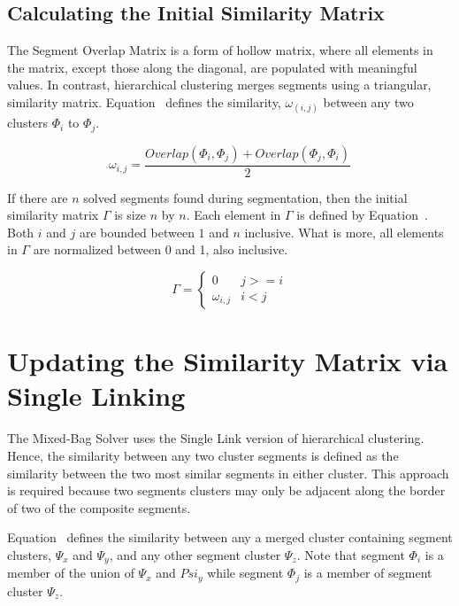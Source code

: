 \subsection{Calculating the Initial Similarity Matrix}

The Segment Overlap Matrix is a form of hollow matrix, where all elements in the matrix, except those along the diagonal, are populated with meaningful values.  In contrast, hierarchical clustering merges segments using a triangular, similarity matrix.  Equation~ defines the similarity, $\omega_(i,j)$ between any two clusters $\Phi_i$ to $\Phi_j$.

\begin{equation} \label{eq:segmentSimilarity}
\omega_{i,j} = \frac{Overlap(\Phi_i, \Phi_j) + Overlap(\Phi_j, \Phi_i)}{2} 
\end{equation}

If there are $n$ solved segments found during segmentation, then the initial similarity matrix $\Gamma$ is size $n$ by $n$.  Each element in $\Gamma$ is defined by Equation~.  Both $i$ and $j$ are bounded between $1$ and $n$ inclusive.  What is more, all elements in $\Gamma$ are normalized between 0 and 1, also inclusive.

\begin{equation} \label{eq:similarityMatrix}
\Gamma = \begin{cases} 
	0 & j >= i
\\
	\omega_{i,j} & i < j
\end{cases} 
\end{equation}

\section{Updating the Similarity Matrix via Single Linking}

The Mixed-Bag Solver uses the Single Link version of hierarchical clustering.  Hence, the similarity between any two cluster segments is defined as the similarity between the two most similar segments in either cluster.  This approach is required because two segments clusters may only be adjacent along the border of two of the composite segments.  

Equation~ defines the similarity between any a merged cluster containing segment clusters, $\Psi_x$ and $\Psi_y$, and any other segment cluster $\Psi_z$.  Note that segment $\Phi_i$ is a member of the union of $\Psi_x$ and $Psi_y$ while segment $\Phi_j$ is a member of segment cluster $\Psi_z$.

